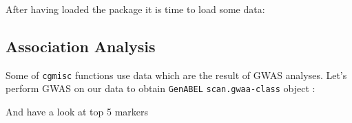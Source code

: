 \documentclass[12pt,a4paper,oneside]{article}
\begin{document}
\noindent After having loaded the package it is time to load some data:

\begin{knitrout}\footnotesize
{}\color{fgcolor}\begin{kframe}
\begin{alltt}
  \hlstd{(}\hlstd{)}
\end{alltt}
\end{kframe}
\end{knitrout}

\subsection*{Association Analysis}
\noindent Some of \texttt{cgmisc} functions use data which are the result of GWAS analyses. Let's perform GWAS on our data to obtain \texttt{GenABEL} \texttt{scan.gwaa-class} object : 

\begin{knitrout}\footnotesize
{}\color{fgcolor}\begin{kframe}
\begin{alltt}
 \hlkwb{<-}  \hlopt{~}   
\end{alltt}


{\ttfamily\noindent\color{warningcolor}{\#\# Warning: 1 observations deleted due to missingness}}\end{kframe}
\end{knitrout}

\noindent And have a look at top 5 markers
\end{document}
